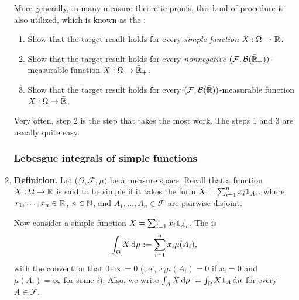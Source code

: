 \begin{enumerate}
\begin{enumerate}[label={(\arabic*)}]
\end{enumerate}
More generally, in many measure theoretic proofs, this kind of procedure is
also utilized, which is known as the :
\begin{enumerate}[label={(\arabic*)}]
\item Show that the target result holds for every \emph{simple function} \(X:\Omega\to\mathbb{R}\).
\item Show that the target result holds for every
\emph{nonnegative} \((\mathcal{F},\mathcal{B}(\bar{\mathbb{R}}_{+}))\)-measurable function
\(X:\Omega\to\bar{\mathbb{R}}_{+}\).
\item Show that the target result holds for every
\((\mathcal{F},\mathcal{B}(\bar{\mathbb{R}}))\)-measurable function
\(X:\Omega\to\bar{\mathbb{R}}\).
\end{enumerate}
Very often, step 2 is the step that takes the most work. The steps 1 and 3 are
usually quite easy.
\subsubsection*{Lebesgue integrals of simple functions}
\item \textbf{Definition.} Let
(\(\Omega,\mathcal{F},\mu)\) be a measure space. Recall that a function
\(X:\Omega\to\mathbb{R}\) is said to be simple if it takes the form
\(X=\sum_{i=1}^{n}x_i\mathbf{1}_{A_i}\), where \(x_1,\dotsc,x_n\in\mathbb{R}\), \(n\in\mathbb{N}\),
and \(A_1,\dotsc,A_n\in\mathcal{F}\) are pairwise disjoint.

Now consider a simple function \(X=\sum_{i=1}^{n}x_i\mathbf{1}_{A_i}\). The
 is
\[
\int_{\Omega}^{}X\odif{\mu}:=\sum_{i=1}^{n}x_i\mu(A_i),
\]
with the convention that \(0\cdot \infty=0\) (i.e., \(x_i\mu(A_i)=0\) if
\(x_i=0\) and \(\mu(A_i)=\infty\) for some \(i\)). Also, we write
\(\int_{A}^{}X\odif{\mu}:=\int_{\Omega}^{}X\indic_{A}\odif{\mu}\) for every \(A\in\mathcal{F}\).


\end{enumerate}
